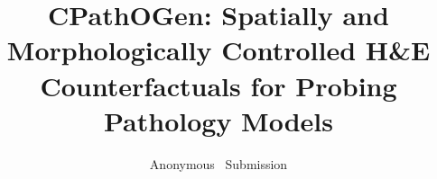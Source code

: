 \documentclass[10pt,twocolumn,letterpaper]{article}
\title{CPathOGen: Spatially and Morphologically Controlled H\&E Counterfactuals for Probing Pathology Models}
\author{Anonymous \confName~\confYear Submission}
\begin{document}
\maketitle











{\small


}
\end{document}
